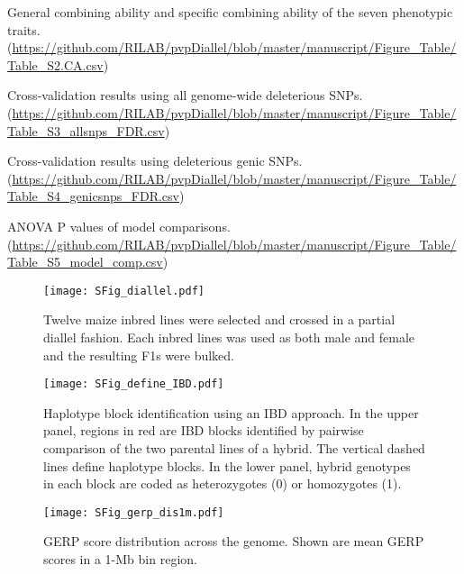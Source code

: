 \documentclass[twoside, twocolumn, letterpaper]{article}
\begin{document}
\begin{table}[]
\caption{General combining ability and specific combining ability of the seven phenotypic traits. (\url{https://github.com/RILAB/pvpDiallel/blob/master/manuscript/Figure_Table/Table_S2.CA.csv})}
\label{table:table_s2}
\end{table}

\begin{table}[]
\caption{Cross-validation results using all genome-wide deleterious SNPs. (\url{https://github.com/RILAB/pvpDiallel/blob/master/manuscript/Figure_Table/Table_S3_allsnps_FDR.csv})}
\label{table:table_s3}
\end{table}

\begin{table}[]
\caption{Cross-validation results using deleterious genic SNPs. (\url{https://github.com/RILAB/pvpDiallel/blob/master/manuscript/Figure_Table/Table_S4_genicsnps_FDR.csv})}
\label{table:table_s4}
\end{table}

\begin{table}[]
\caption{ANOVA P values of model comparisons. (\url{https://github.com/RILAB/pvpDiallel/blob/master/manuscript/Figure_Table/Table_S5_model_comp.csv})}
\label{table:table_s5}
\end{table}

\begin{figure}[htbp]
\centering
\texttt{[image: SFig\_diallel.pdf]}
\caption{Twelve maize inbred lines were selected and crossed in a partial diallel fashion. Each inbred lines was used as both male and female and the resulting F1s were bulked. }
\label{fig:diallel}
\end{figure}


\begin{figure}[htbp]
\centering
\texttt{[image: SFig\_define\_IBD.pdf]}
\caption{Haplotype block identification using an IBD approach. In the upper panel, regions in red are IBD blocks identified by pairwise comparison of the two parental lines of a hybrid. The vertical dashed lines define haplotype blocks. In the lower panel, hybrid genotypes in each block are coded as heterozygotes (0) or homozygotes (1).}
\label{fig:defineibd}
\end{figure}




\begin{figure}[htbp]
\centering
\texttt{[image: SFig\_gerp\_dis1m.pdf]}
\caption{GERP score distribution across the genome. Shown are mean GERP scores in a 1-Mb bin region.}
\label{fig:dis1m}
\end{figure}
\end{document}

